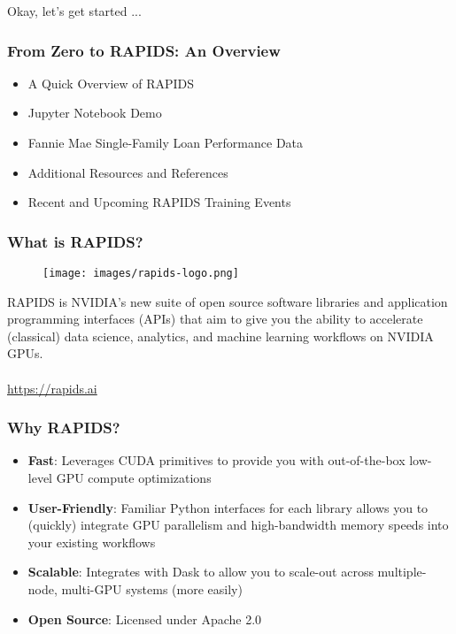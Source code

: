 \documentclass{beamer}
\begin{document}
\begin{frame}
   Okay, let's get started ...
\end{frame}

\begin{frame}
   \frametitle{From Zero to RAPIDS: An Overview}
   \begin{itemize}\setlength\itemsep{1.5em}
      \item A Quick Overview of RAPIDS
      \item Jupyter Notebook Demo
      \item Fannie Mae Single-Family Loan Performance Data
      \item Additional Resources and References
      \item Recent and Upcoming RAPIDS Training Events
   \end{itemize}
\end{frame}

\begin{frame}
   \frametitle{What is RAPIDS?}
   \begin{figure}[htbp]
      \texttt{[image: images/rapids-logo.png]}
   \end{figure}
   RAPIDS is NVIDIA's new suite of open source software libraries and
   application programming interfaces (APIs) that aim to give you the
   ability to accelerate (classical) data science, analytics, and
   machine learning workflows on NVIDIA GPUs.
   \\ \ \\
   \url{https://rapids.ai}
\end{frame}

\begin{frame}
   \frametitle{Why RAPIDS?}
   \begin{itemize}\setlength\itemsep{1.5em}
      \item \textbf{Fast}: Leverages CUDA primitives to provide you with
         out-of-the-box low-level GPU compute optimizations
      \item \textbf{User-Friendly}: Familiar Python interfaces for each
         library allows you to (quickly) integrate GPU parallelism and 
         high-bandwidth memory speeds into your existing workflows
      \item \textbf{Scalable}: Integrates with Dask to allow you to scale-out
         across multiple-node, multi-GPU systems (more easily)
      \item \textbf{Open Source}: Licensed under Apache 2.0
   \end{itemize}
\end{frame}
\end{document}
